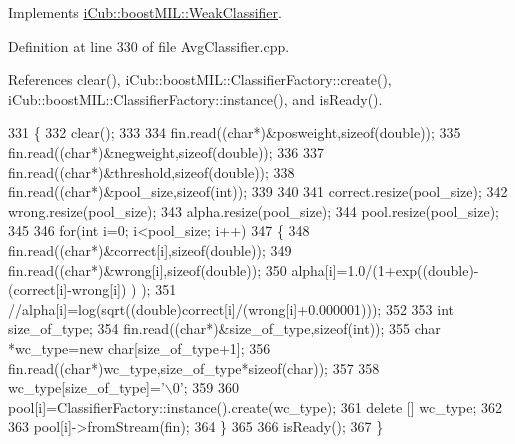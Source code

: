 Implements \hyperlink{classiCub_1_1boostMIL_1_1WeakClassifier_ab33627f7dd2c377635f653add1a55107}{i\+Cub\+::boost\+M\+I\+L\+::\+Weak\+Classifier}.



Definition at line 330 of file Avg\+Classifier.\+cpp.



References clear(), i\+Cub\+::boost\+M\+I\+L\+::\+Classifier\+Factory\+::create(), i\+Cub\+::boost\+M\+I\+L\+::\+Classifier\+Factory\+::instance(), and is\+Ready().


\begin{DoxyCode}
331 \{
332     clear();
333 
334     fin.read((\textcolor{keywordtype}{char}*)&posweight,\textcolor{keyword}{sizeof}(\textcolor{keywordtype}{double}));
335     fin.read((\textcolor{keywordtype}{char}*)&negweight,\textcolor{keyword}{sizeof}(\textcolor{keywordtype}{double}));
336 
337     fin.read((\textcolor{keywordtype}{char}*)&threshold,\textcolor{keyword}{sizeof}(\textcolor{keywordtype}{double}));
338     fin.read((\textcolor{keywordtype}{char}*)&pool\_size,\textcolor{keyword}{sizeof}(\textcolor{keywordtype}{int}));
339 
340 
341     correct.resize(pool\_size);
342     wrong.resize(pool\_size);
343     alpha.resize(pool\_size);
344     pool.resize(pool\_size);
345 
346     \textcolor{keywordflow}{for}(\textcolor{keywordtype}{int} i=0; i<pool\_size; i++)
347     \{
348         fin.read((\textcolor{keywordtype}{char}*)&correct[i],\textcolor{keyword}{sizeof}(\textcolor{keywordtype}{double}));
349         fin.read((\textcolor{keywordtype}{char}*)&wrong[i],\textcolor{keyword}{sizeof}(\textcolor{keywordtype}{double}));
350         alpha[i]=1.0/(1+exp((\textcolor{keywordtype}{double})-(correct[i]-wrong[i]) ) );
351         \textcolor{comment}{//alpha[i]=log(sqrt((double)correct[i]/(wrong[i]+0.000001)));}
352 
353         \textcolor{keywordtype}{int} size\_of\_type;
354         fin.read((\textcolor{keywordtype}{char}*)&size\_of\_type,\textcolor{keyword}{sizeof}(\textcolor{keywordtype}{int}));
355         \textcolor{keywordtype}{char} *wc\_type=\textcolor{keyword}{new} \textcolor{keywordtype}{char}[size\_of\_type+1];
356         fin.read((\textcolor{keywordtype}{char}*)wc\_type,size\_of\_type*\textcolor{keyword}{sizeof}(\textcolor{keywordtype}{char}));
357 
358         wc\_type[size\_of\_type]=\textcolor{charliteral}{'\(\backslash\)0'};
359 
360         pool[i]=ClassifierFactory::instance().create(wc\_type);
361         \textcolor{keyword}{delete} [] wc\_type;
362 
363         pool[i]->fromStream(fin);
364     \}
365 
366     isReady();
367 \}
\end{DoxyCode}

